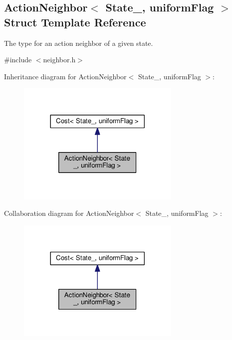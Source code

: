\hypertarget{structActionNeighbor}{}\subsection{Action\+Neighbor$<$ State\+\_\+, uniform\+Flag $>$ Struct Template Reference}
\label{structActionNeighbor}


The type for an action neighbor of a given state.  




{\ttfamily \#include $<$neighbor.\+h$>$}



Inheritance diagram for Action\+Neighbor$<$ State\+\_\+, uniform\+Flag $>$\+:\nopagebreak
\begin{figure}[H]
\begin{center}
\leavevmode
\includegraphics[width=221pt]{structActionNeighbor__inherit__graph}
\end{center}
\end{figure}


Collaboration diagram for Action\+Neighbor$<$ State\+\_\+, uniform\+Flag $>$\+:\nopagebreak
\begin{figure}[H]
\begin{center}
\leavevmode
\includegraphics[width=221pt]{structActionNeighbor__coll__graph}
\end{center}
\end{figure}
